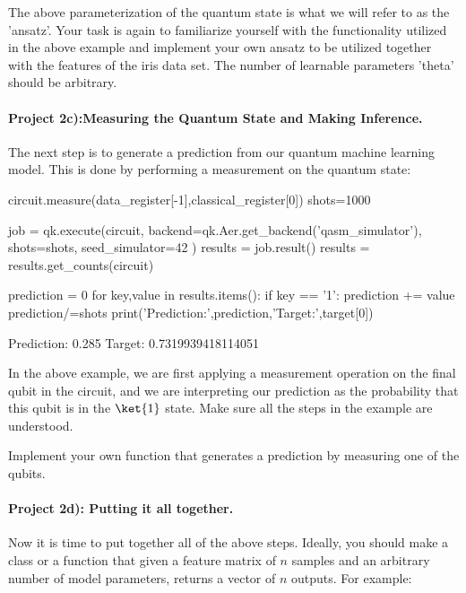 \documentclass[%
oneside,                 %
final,                   %
10pt]{article}
\begin{document}
The above parameterization of the quantum state is what we will refer
to as the 'ansatz'. Your task is again to familiarize yourself with
the functionality utilized in the above example and implement your own
ansatz to be utilized together with the features of the
iris data set. The number of learnable parameters 'theta'
should be arbitrary.



\paragraph{Project 2c):Measuring the Quantum State and Making Inference.}
The next step is to generate a prediction from our quantum machine learning model. This is done by performing a measurement on the quantum state:

\begin{print}
circuit.measure(data_register[-1],classical_register[0])
shots=1000

job = qk.execute(circuit,
                backend=qk.Aer.get_backend('qasm_simulator'),
                shots=shots,
                seed_simulator=42
                )
results = job.result()
results = results.get_counts(circuit)

prediction = 0
for key,value in results.items():
    if key == '1':
        prediction += value
prediction/=shots
print('Prediction:',prediction,'Target:',target[0])
\end{print}
\begin{print}
    Prediction: 0.285 Target: 0.7319939418114051
\end{print}

In the above example, we are first applying a measurement operation on
the final qubit in the circuit, and we are interpreting our prediction
as the probability that this qubit is in the $\ket{1}$ state. Make
sure all the steps in the example are understood.

Implement your own function that generates a prediction by measuring one of the qubits.



\paragraph{Project 2d): Putting it all together.}
Now it is time to put together all of the above steps. Ideally, you
should make a class or a function that given a feature matrix of $n$
samples and an arbitrary number of model parameters, returns a vector
of $n$ outputs. For example:
\end{document}
